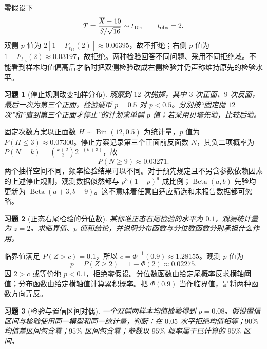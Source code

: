 \documentclass[UTF8,12pt,a4paper,fontset=fandol]{ctexart}
\newtheorem{exercise}{习题}[section]
\begin{document}
\begin{solve}\label{a:M-P9-1}零假设下\[T=\frac{\overline X-10}{S/\sqrt{16}}\sim t_{15},\qquad t_{\rm obs}=2.\]双侧 $p$ 值为 $2[1-F_{t_{15}}(2)]\approx0.06395$，故不拒绝；右侧 $p$ 值为 $1-F_{t_{15}}(2)\approx0.03197$，故拒绝。两种检验回答不同问题、采用不同拒绝域。不能看到样本均值偏高后才临时把双侧检验改成右侧检验并仍声称维持原先的检验水平。\end{solve}

\begin{exercise}[停止规则改变抽样分布]\label{q:M-P9-2}
观察到 $12$ 次抛掷，其中 $3$ 次正面、$9$ 次反面，最后一次为第三个正面。检验硬币 $p=0.5$ 对 $p<0.5$。分别按“固定抛 $12$ 次”和“直到第三个正面才停止”的计划求单侧 $p$ 值；若采用贝塔先验，比较后验。\par{}
\end{exercise}

\begin{solve}\label{a:M-P9-2}固定次数方案以正面数 $H\sim\operatorname{Bin}(12,0.5)$ 为统计量，$p$ 值为 $P(H\le3)\approx0.07300$。停止方案记录第三个正面前反面数 $N$，其负二项概率为 $P(N=k)=\binom{k+2}{2}2^{-(k+3)}$，故\[P(N\ge9)\approx0.03271.\]两个抽样空间不同，频率检验结果可以不同。对于预先规定且不另含参数依赖因素的上述停止规则，观测数据似然都与 $p^3(1-p)^9$ 成比例；$\operatorname{Beta}(a,b)$ 先验均更新为 $\operatorname{Beta}(a+3,b+9)$。这不意味着任意自适应筛选和未报告数据都可忽略。\end{solve}

\begin{exercise}[正态右尾检验的分位数]\label{q:M-E2-II4}
某标准正态右尾检验的水平为 $0.1$，观测统计量为 $z=2$。求临界值、$p$ 值和结论，并说明分布函数与分位数函数分别承担什么作用。\par{}
\end{exercise}

\begin{solve}\label{a:M-E2-II4}临界值满足 $P(Z>c)=0.1$，所以 $c=\Phi^{-1}(0.9)\approx1.28155$。观测 $p$ 值为\[p=P(Z\ge2)=1-\Phi(2)\approx0.02275.\]因 $2>c$ 或等价地 $p<0.1$，拒绝零假设。分位数函数由给定尾概率反求横轴阈值；分布函数由给定横轴值计算累积概率。把 $\Phi(0.9)$ 当作临界值，是将两种函数方向弄反。\end{solve}

\begin{exercise}[检验与置信区间对偶]\label{q:M-F-C10}
一个双侧两样本均值检验得到 $p=0.08$。假设置信区间与检验使用同一模型和同一统计量，判断：在 $0.05$ 水平拒绝均值相等；$90\%$ 均值差区间包含零；$95\%$ 区间包含零；参数以 $95\%$ 概率属于已计算的 $95\%$ 区间。\par{}
\end{exercise}
\end{document}
